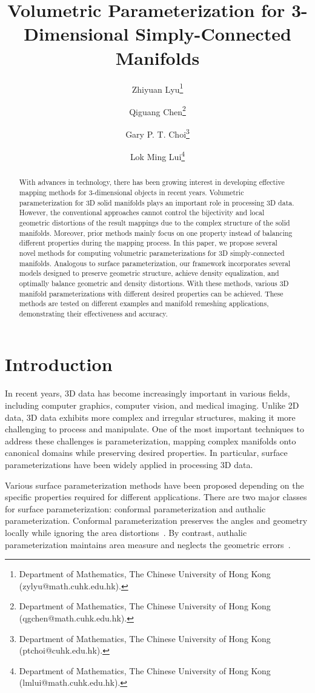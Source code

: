 \documentclass{article}
\title{Volumetric Parameterization for 3-Dimensional Simply-Connected Manifolds}
\author{Zhiyuan Lyu\thanks{Department of Mathematics, The Chinese University of Hong Kong
  ({zylyu@math.cuhk.edu.hk}).}
\and Qiguang Chen\thanks{Department of Mathematics, The Chinese University of Hong Kong
  ({qgchen@math.cuhk.edu.hk}).}
\and Gary P. T. Choi\thanks{Department of Mathematics, The Chinese University of Hong Kong
  ({ptchoi@cuhk.edu.hk}).}
\and Lok Ming Lui\thanks{Department of Mathematics, The Chinese University of Hong Kong
  ({lmlui@math.cuhk.edu.hk}).}}
\date{}
\begin{document}
\maketitle
\begin{abstract}
With advances in technology, there has been growing interest in developing effective mapping methods for 3-dimensional objects in recent years. Volumetric parameterization for 3D solid manifolds plays an important role in processing 3D data. However, the conventional approaches cannot control the bijectivity and local geometric distortions of the result mappings due to the complex structure of the solid manifolds. Moreover, prior methods mainly focus on one property instead of balancing different properties during the mapping process. In this paper, we propose several novel methods for computing volumetric parameterizations for 3D simply-connected manifolds. Analogous to surface parameterization, our framework incorporates several models designed to preserve geometric structure, achieve density equalization, and optimally balance geometric and density distortions. With these methods, various 3D manifold parameterizations with different desired properties can be achieved. These methods are tested on different examples and manifold remeshing applications, demonstrating their effectiveness and accuracy.
\end{abstract}



\section{Introduction}

In recent years, 3D data has become increasingly important in various fields, including computer graphics, computer vision, and medical imaging. Unlike 2D data, 3D data exhibits more complex and irregular structures, making it more challenging to process and manipulate. One of the most important techniques to address these challenges is parameterization, mapping complex manifolds onto canonical domains while preserving desired properties. In particular, surface parameterizations have been widely applied in processing 3D data.  

Various surface parameterization methods have been proposed depending on the specific properties required for different applications. There are two major classes for surface parameterization: conformal parameterization and authalic parameterization. Conformal parameterization preserves the angles and geometry locally while ignoring the area distortions~\cite{choi2015flash}. By contrast, authalic parameterization maintains area measure and neglects the geometric errors~\cite{su2016area}. 
\end{document}
